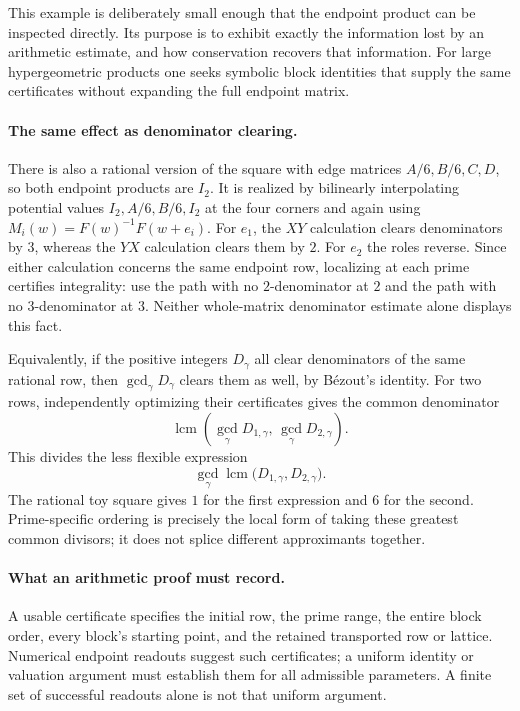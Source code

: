 \documentclass[11pt]{article}
\begin{document}
This example is deliberately small enough that the endpoint product can be
inspected directly.  Its purpose is to exhibit exactly the information
lost by an arithmetic estimate, and how conservation recovers that
information.  For large hypergeometric products one seeks symbolic block
identities that supply the same certificates without expanding the full
endpoint matrix.

\paragraph{The same effect as denominator clearing.}
There is also a rational version of the square with edge matrices
$A/6,B/6,C,D$, so both endpoint products are $I_2$.  It is realized by
bilinearly interpolating potential values
$I_2,A/6,B/6,I_2$ at the four corners and again using
$M_i(w)=F(w)^{-1}F(w+e_i)$.
For $e_1$, the $XY$ calculation clears denominators by $3$, whereas the
$YX$ calculation clears them by $2$.  For $e_2$ the roles reverse.
Since either calculation concerns the same endpoint row, localizing at
each prime certifies integrality: use the path with no $2$-denominator at
$2$ and the path with no $3$-denominator at $3$.  Neither whole-matrix
denominator estimate alone displays this fact.

Equivalently, if the positive integers $D_\gamma$ all clear denominators
of the same rational row, then $\gcd_\gamma D_\gamma$ clears them as well,
by B\'ezout's identity.  For two rows, independently optimizing their
certificates gives the common denominator
\[
 \operatorname{lcm}\!\left(
 \gcd_\gamma D_{1,\gamma},\,
 \gcd_\gamma D_{2,\gamma}\right).
\]
This divides the less flexible expression
\[
 \gcd_\gamma\operatorname{lcm}
 \bigl(D_{1,\gamma},D_{2,\gamma}\bigr).
\]
The rational toy square gives $1$ for the first expression and $6$ for
the second.  Prime-specific ordering is precisely the local form of
taking these greatest common divisors; it does not splice different
approximants together.

\paragraph{What an arithmetic proof must record.}
A usable certificate specifies the initial row, the prime range, the
entire block order, every block's starting point, and the retained
transported row or lattice.  Numerical endpoint readouts suggest such
certificates; a uniform identity or valuation argument must establish
them for all admissible parameters.  A finite set of successful readouts
alone is not that uniform argument.
\end{document}
